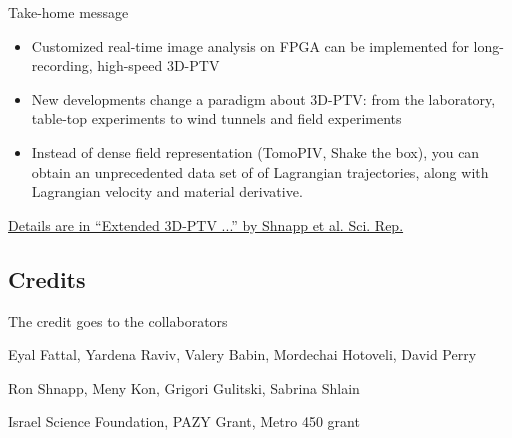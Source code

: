 \documentclass[aspectratio=43]{beamer}
\begin{document}
\begin{frame}{Take-home message}
\begin{itemize}
\item Customized real-time image analysis on FPGA can be implemented for long-recording, high-speed 3D-PTV
\item New developments change a paradigm about 3D-PTV: from the laboratory, table-top experiments to wind tunnels and field experiments
\item Instead of dense field representation (TomoPIV, Shake the box),  you can obtain an unprecedented data set of of Lagrangian trajectories, along with Lagrangian velocity and material derivative. 
\end{itemize}

\begin{cardTiny}\href{https://www.nature.com/articles/s41598-019-43555-2}{Details are in ``Extended 3D-PTV ...'' by Shnapp et al. Sci. Rep.}
\end{cardTiny}

\end{frame}
%

%
%

\subsection{Credits}

\begin{frame}[label=credit-1]{The credit goes to the collaborators }
\begin{multicols}{2}
\centering
{} 
\end{multicols}
\end{frame}
%
\begin{frame}[label=credit-2]
\begin{card}
Eyal Fattal, Yardena Raviv, Valery Babin, Mordechai Hotoveli, David Perry
\end{card}
\begin{card}[TAU]
Ron Shnapp, Meny Kon, Grigori Gulitski, Sabrina Shlain
\end{card}
\begin{card}[Funding]
Israel Science Foundation, PAZY Grant, Metro 450 grant
\end{card}
\end{frame}
%
\end{document}
